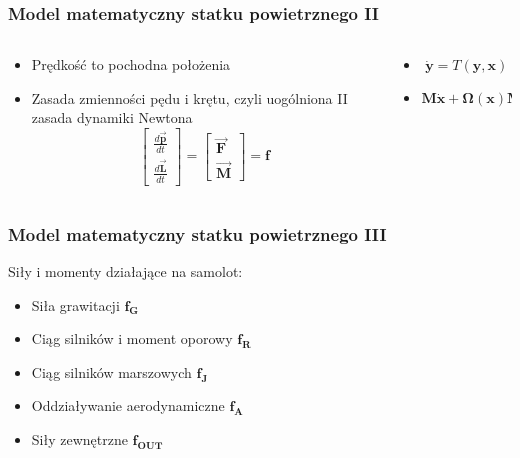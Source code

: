 \documentclass[aspectratio=169]{beamer}
\begin{document}
\begin{frame}%
	\frametitle{Model matematyczny statku powietrznego II}
	\begin{columns}[T]
		\begin{column}{0.5\textwidth}
			 \begin{itemize}
			  \item<2-> {
			    Prędkość to pochodna położenia
			    \vspace{15pt}
			  }
			  \item<4-> {   
			    Zasada zmienności pędu i krętu, czyli uogólniona II zasada dynamiki Newtona
			    \[
		              \begin{bmatrix}\frac{d\bm{\vec{p}}}{dt}\\ \frac{d\bm{\vec{L}}}{dt} \end{bmatrix} = \begin{bmatrix}\bm{\vec{F}}\\ \bm{\vec{M}} \end{bmatrix} = \bm{f}
		              \]
			    }
			\end{itemize}
		\end{column}
		\begin{column}{0.5\textwidth}
	   	 	\begin{itemize}
			  \item<3->[] {
			   \[
			   	\bm{\dot{y}} = T(\bm{y}, \bm{x})
			   \]
			  }
			  \vspace{15pt}
			  
			  \item<5->[]{   
			    \[
			   	\bm{M} \bm{\dot{x}} +  \bm{\Omega} \left( \bm{x} \right) \bm{M} \bm{x} = \bm{f}
			   \]
			    }
			\end{itemize}
		\end{column}
	\end{columns}
\end{frame}

\begin{frame}%
	\frametitle{Model matematyczny statku powietrznego III}
	Siły i momenty działające na samolot:
			 \begin{itemize}
			  \item<2-> {
			    Siła grawitacji  $\bm{f_G}$
			  }
			  \item<3-> {   
			    Ciąg silników i moment oporowy  $\bm{f_R}$
			   }
			    \item<4-> {   
			    Ciąg silników marszowych  $\bm{f_J}$
			   }
			    \item<5-> {   
			    Oddziaływanie aerodynamiczne $\bm{f_A}$
			   }
			    \item<6-> {   
			   Siły zewnętrzne $\bm{f_{OUT}}$
			   }
			\end{itemize}
\end{frame}
\end{document}
